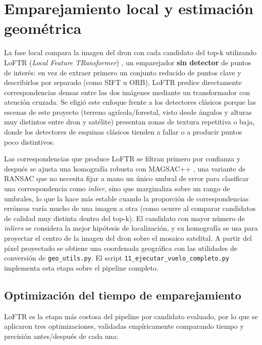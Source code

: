 \section{Emparejamiento local y estimación geométrica}
\label{sec:emparejamiento-local}

La fase local compara la imagen del dron con cada candidato del top-k utilizando LoFTR (\textit{Local Feature TRansformer}) \parencite{sun2021loftr}, un emparejador \textbf{sin detector} de puntos de interés: en vez de extraer primero un conjunto reducido de puntos clave y describirlos por separado (como SIFT u ORB), LoFTR predice directamente correspondencias densas entre las dos imágenes mediante un transformador con atención cruzada. Se eligió este enfoque frente a los detectores clásicos porque las escenas de este proyecto (terreno agrícola/forestal, visto desde ángulos y alturas muy distintos entre dron y satélite) presentan zonas de textura repetitiva o baja, donde los detectores de esquinas clásicos tienden a fallar o a producir puntos poco distintivos.

Las correspondencias que produce LoFTR se filtran primero por confianza y después se ajusta una homografía robusta con MAGSAC++ \parencite{barath2020magsac++}, una variante de RANSAC que no necesita fijar a mano un único umbral de error para clasificar una correspondencia como \textit{inlier}, sino que marginaliza sobre un rango de umbrales, lo que la hace más estable cuando la proporción de correspondencias erróneas varía mucho de una imagen a otra (como ocurre al comparar candidatos de calidad muy distinta dentro del top-k). El candidato con mayor número de \textit{inliers} se considera la mejor hipótesis de localización, y su homografía se usa para proyectar el centro de la imagen del dron sobre el mosaico satelital. A partir del píxel proyectado se obtiene una coordenada geográfica con las utilidades de conversión de \texttt{geo\_utils.py}. El script \texttt{11\_ejecutar\_vuelo\_completo.py} implementa esta etapa sobre el pipeline completo.

\subsection{Optimización del tiempo de emparejamiento}
\label{sec:optimizacion-loftr}

LoFTR es la etapa más costosa del pipeline por candidato evaluado, por lo que se aplicaron tres optimizaciones, validadas empíricamente comparando tiempo y precisión antes/después de cada una:

